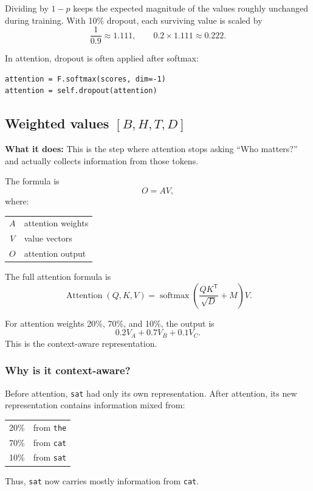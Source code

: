 Dividing by \(1-p\) keeps the expected magnitude of the values roughly
unchanged during training. With 10\% dropout, each surviving value is scaled
by
\[
  \frac{1}{0.9}\approx1.111,
  \qquad
  0.2\times1.111\approx0.222.
\]

In attention, dropout is often applied after softmax:
\begin{lstlisting}[style=shadedpython]
attention = F.softmax(scores, dim=-1)
attention = self.dropout(attention)
\end{lstlisting}

\subsection{Weighted values \( [B,H,T,D] \)}

\textbf{What it does:} This is the step where attention stops asking
``Who matters?'' and actually collects information from those tokens.

The formula is
\[
  O=AV,
\]
where:
\begin{center}
\begin{tabular}{@{}cl@{}}
  \(A\) & attention weights \\
  \(V\) & value vectors \\
  \(O\) & attention output
\end{tabular}
\end{center}



The full attention formula is
\[
  \boxed{
    \operatorname{Attention}(Q,K,V)
    =\operatorname{softmax}\!\left(
      \frac{QK^{\mathsf T}}{\sqrt{D}}+M
    \right)V
  }.
\]

For attention weights 20\%, 70\%, and 10\%, the output is
\[
  0.2V_A+0.7V_B+0.1V_C.
\]
This is the context-aware representation.

\subsubsection*{Why is it context-aware?}

Before attention, \texttt{sat} had only its own representation. After
attention, its new representation contains information mixed from:
\begin{center}
\begin{tabular}{@{}cl@{}}
  20\% & from \texttt{the} \\
  70\% & from \texttt{cat} \\
  10\% & from \texttt{sat}
\end{tabular}
\end{center}
Thus, \texttt{sat} now carries mostly information from \texttt{cat}.

